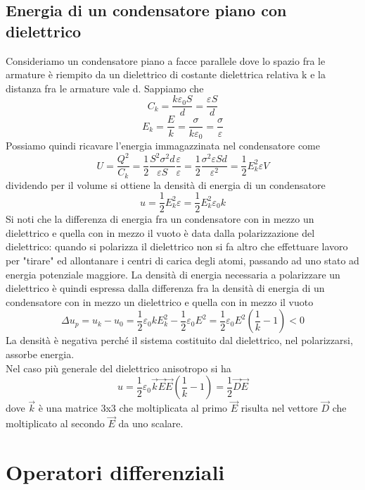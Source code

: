 \documentclass[10pt,a4paper]{article}
\begin{document}
\subsection{Energia di un condensatore piano con dielettrico}
Consideriamo un condensatore piano a facce parallele dove lo spazio fra le armature è riempito da un dielettrico di costante dielettrica relativa k e la distanza fra le armature vale d. Sappiamo che
\[C_k = \frac{k\varepsilon_0 S}{d} = \frac{\varepsilon S}{d}\]
\[E_k = \frac{E}{k} = \frac{\sigma}{k\varepsilon_0} = \frac{\sigma}{\varepsilon}\]
Possiamo quindi ricavare l'energia immagazzinata nel condensatore come
\[U = \frac{Q^2}{C_k} = \frac{1}{2}\frac{S^2\sigma^2 d}{\varepsilon S}\frac{\varepsilon}{\varepsilon} = \frac{1}{2}\frac{\sigma^2\varepsilon S d}{\varepsilon^2} = \frac{1}{2}E_k^2\varepsilon V\]
dividendo per il volume si ottiene la densità di energia di un condensatore
\[u = \frac{1}{2}E_k^2\varepsilon  = \frac{1}{2}E_k^2\varepsilon_0 k\]
Si noti che la differenza di energia fra un condensatore con in mezzo un dielettrico e quella con in mezzo il vuoto è data dalla polarizzazione del dielettrico: quando si polarizza il dielettrico non si fa altro che effettuare lavoro per "tirare" ed allontanare i centri di carica degli atomi, passando ad uno stato ad energia potenziale maggiore. La densità di energia necessaria a polarizzare un dielettrico è quindi espressa dalla differenza fra la densità di energia di un condensatore con in mezzo un dielettrico e quella con in mezzo il vuoto
\[\Delta u_p = u_k-u_0 = \frac{1}{2}\varepsilon_0 kE_k^2-\frac{1}{2}\varepsilon_0 E^2 = \frac{1}{2}\varepsilon_0 E^2(\frac{1}{k}-1)<0 \]
La densità è negativa perché il sistema costituito dal dielettrico, nel polarizzarsi, assorbe energia.\\
Nel caso più generale del dielettrico anisotropo si ha 
\[u = \frac{1}{2}\varepsilon_0 \vec{k} \vec{E} \vec{E}(\frac{1}{k}-1) =\frac{1}{2} \vec{D} \vec{E}\]
dove $\vec{k}$ è una matrice 3x3 che moltiplicata al primo $\vec{E}$ risulta nel vettore $\vec{D}$ che moltiplicato al secondo $\vec{E}$ da uno scalare.
\appendix
\section{Operatori differenziali}
\end{document}
